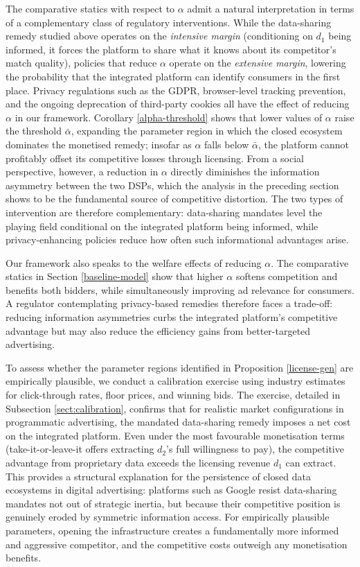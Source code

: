 \noindent The comparative statics with respect to $\alpha$ admit a natural interpretation in terms of a complementary class of regulatory interventions. While the data-sharing remedy studied above operates on the \textit{intensive margin} (conditioning on $d_1$ being informed, it forces the platform to share what it knows about its competitor's match quality), policies that reduce $\alpha$ operate on the \textit{extensive margin}, lowering the probability that the integrated platform can identify consumers in the first place. Privacy regulations such as the GDPR, browser-level tracking prevention, and the ongoing deprecation of third-party cookies all have the effect of reducing $\alpha$ in our framework. Corollary \ref{alpha-threshold} shows that lower values of $\alpha$ raise the threshold $\bar{\alpha}$, expanding the parameter region in which the closed ecosystem dominates the monetised remedy; insofar as $\alpha$ falls below $\bar{\alpha}$, the platform cannot profitably offset its competitive losses through licensing. From a social perspective, however, a reduction in $\alpha$ directly diminishes the information asymmetry between the two DSPs, which the analysis in the preceding section shows to be the fundamental source of competitive distortion. The two types of intervention are therefore complementary: data-sharing mandates level the playing field conditional on the integrated platform being informed, while privacy-enhancing policies reduce how often such informational advantages arise.

\noindent Our framework also speaks to the welfare effects of reducing $\alpha$. The comparative statics in Section \ref{baseline-model} show that higher $\alpha$ softens competition and benefits both bidders, while simultaneously improving ad relevance for consumers. A regulator contemplating privacy-based remedies therefore faces a trade-off: reducing information asymmetries curbs the integrated platform's competitive advantage but may also reduce the efficiency gains from better-targeted advertising.

\noindent To assess whether the parameter regions identified in Proposition \ref{license-gen} are empirically plausible, we conduct a calibration exercise using industry estimates for click-through rates, floor prices, and winning bids. The exercise, detailed in Subsection \ref{sect:calibration}, confirms that for realistic market configurations in programmatic advertising, the mandated data-sharing remedy imposes a net cost on the integrated platform. Even under the most favourable monetisation terms (take-it-or-leave-it offers extracting $d_2$'s full willingness to pay), the competitive advantage from proprietary data exceeds the licensing revenue $d_1$ can extract. This provides a structural explanation for the persistence of closed data ecosystems in digital advertising: platforms such as Google resist data-sharing mandates not out of strategic inertia, but because their competitive position is genuinely eroded by symmetric information access. For empirically plausible parameters, opening the infrastructure creates a fundamentally more informed and aggressive competitor, and the competitive costs outweigh any monetisation benefits.\par

